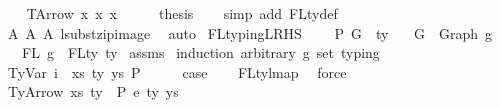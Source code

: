 \begin{isabellebody}
\isanewline
\ \ \isamarkupfalse%
\ {\isacharparenleft}{\kern0pt}TArrow\ x{}{}\ x{}{}\ x{}{}{\isacharparenright}{\kern0pt}\isanewline
\ \ \isamarkupfalse%
\ \isamarkupfalse%
\ {\isacharquery}{\kern0pt}thesis\isanewline
\ \ \isamarkupfalse%
\ {\isacharparenleft}{\kern0pt}simp\ add{\isacharcolon}{\kern0pt}\ FLty{\isacharunderscore}{\kern0pt}def{\isacharparenright}{\kern0pt}\isanewline
\ \ \isamarkupfalse%
\ A{}\ A{}\ A{}\ lsubst{\isacharunderscore}{\kern0pt}zip{\isacharunderscore}{\kern0pt}image\ \isamarkupfalse%
\ auto\isanewline
{}\isamarkupfalse%
%
\endisatagproof
{\isafoldproof}%
%
\isadelimproof
\isanewline
%
\endisadelimproof
\isanewline
\isanewline
{}\isamarkupfalse%
\ FL{\isacharunderscore}{\kern0pt}typing{\isacharunderscore}{\kern0pt}LRHS{\isacharcolon}{\kern0pt}\isanewline
\ \ \ {\isachardoublequoteopen}{\isasymGamma}\ {\isasymturnstile}{\isacharbraceleft}{\kern0pt}P{\isacharbraceright}{\kern0pt}\ G\ {\isacharcolon}{\kern0pt}\ ty{\isachardoublequoteclose}\isanewline
\ \ \ {\isachardoublequoteopen}G\ {\isacharequal}{\kern0pt}\ Graph\ g{\isachardoublequoteclose}\isanewline
\ \ \ {\isachardoublequoteopen}FL\ g\ {\isacharequal}{\kern0pt}\ FLty\ ty{\isachardoublequoteclose}\isanewline
%
\isadelimproof
%
\endisadelimproof
%
\isatagproof
{}\isamarkupfalse%
\ assms\isanewline
{}\isamarkupfalse%
\ {\isacharparenleft}{\kern0pt}induction\ arbitrary{\isacharcolon}{\kern0pt}\ g\ set{\isacharcolon}{\kern0pt}\ typing{\isacharparenright}{\kern0pt}\isanewline
\ \ \isamarkupfalse%
\ {\isacharparenleft}{\kern0pt}TyVar\ i\ {\isasymGamma}\ xs\ ty\ ys\ P{\isacharparenright}{\kern0pt}\isanewline
\ \ \isamarkupfalse%
\ \isamarkupfalse%
\ {\isacharquery}{\kern0pt}case\isanewline
\ \ \isamarkupfalse%
\ FL{\isacharunderscore}{\kern0pt}ty{\isacharunderscore}{\kern0pt}lmap\ \isamarkupfalse%
\ force\isanewline
{}\isamarkupfalse%
\isanewline
\ \ \isamarkupfalse%
\ {\isacharparenleft}{\kern0pt}TyArrow\ xs\ ty{}\ {\isasymGamma}\ P\ e\ ty{}\ ys{\isacharparenright}{\kern0pt}\isanewline
\ \ \isamarkupfalse%
\ \isamarkupfalse%

\end{isabellebody}

